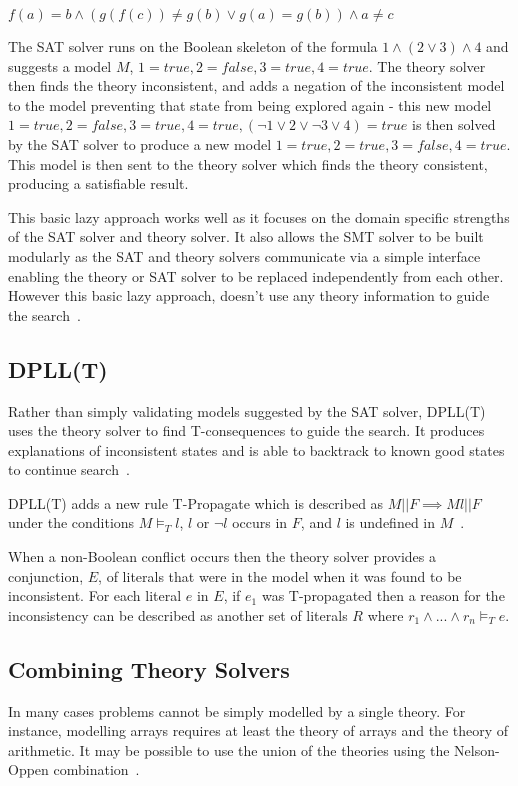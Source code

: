 \documentclass[]{final_report}
\begin{document}
$ f(a) = b \land (g(f(c)) \neq g(b) \lor g(a) = g(b)) \land a \neq c $

The SAT solver runs on the Boolean skeleton of the formula $1 \land (2 \lor 3) \land 4$ and suggests a model $M$, $1 = \mathit{true}, 2 = \mathit{false}, 3 = \mathit{true}, 4 = \mathit{true}$. The theory solver then finds the theory inconsistent, and adds a negation of the inconsistent model to the model preventing that state from being explored again - this new model $ 1 = \mathit{true}, 2 = \mathit{false}, 3 = \mathit{true}, 4 = \mathit{true}, (\lnot 1 \lor 2 \lor \lnot 3 \lor 4 ) = true $ is then solved by the SAT solver to produce a new model $ 1 = \mathit{true}, 2 = \mathit{true}, 3 = \mathit{false}, 4 = \mathit{true}$. This model is then sent to the theory solver which finds the theory consistent, producing a satisfiable result.

This basic lazy approach works well as it focuses on the domain specific strengths of the SAT solver and theory solver. It also allows the SMT solver to be built modularly as the SAT and theory solvers communicate via a simple interface enabling the theory or SAT solver to be replaced independently from each other. However this basic lazy approach, doesn't use any theory information to guide the search~\cite{sattosmt}.

\subsection{DPLL(T)}
Rather than simply validating models suggested by the SAT solver, DPLL(T) uses the theory solver to find T-consequences to guide the search. It produces explanations of inconsistent states and is able to backtrack to known good states to continue search~\cite{smtdpplt, ganzinger2004dpll}.

DPLL(T) adds a new rule T-Propagate which is described as $M || F \implies M l || F $ under the conditions $M \models _T l$, $l$ or $\lnot l$ occurs in $F$, and $l$ is undefined in $M$~\cite{sattosmt}.

When a non-Boolean conflict occurs then the theory solver provides a conjunction, $E$, of literals that were in the model when it was found to be inconsistent. For each literal $e $ in $E$, if $e_1$ was T-propagated then a reason for the inconsistency can be described as another set of literals $R$ where $r_1 \land ... \land r_n \models _T e$. 


\subsection{Combining Theory Solvers}
In many cases problems cannot be simply modelled by a single theory. For instance, modelling arrays requires at least the theory of arrays and the theory of arithmetic. It may be possible to use the union of the theories using the Nelson-Oppen combination~\cite{smtdpplt}.
\end{document}
